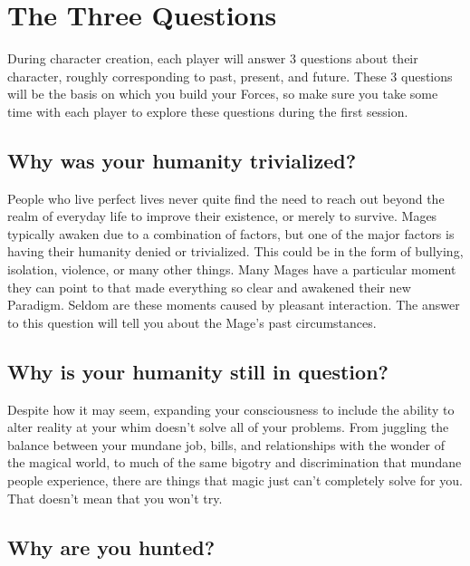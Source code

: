 \documentclass[
  oneside,
  statementpaper,
  9pt]{memoir}
\begin{document}
\hypertarget{the-three-questions-1}{%
\section{The Three Questions}\label{the-three-questions-1}}

During character creation, each player will answer 3 questions about
their character, roughly corresponding to past, present, and future.
These 3 questions will be the basis on which you build your Forces, so
make sure you take some time with each player to explore these questions
during the first session.

\hypertarget{why-was-your-humanity-trivialized}{%
\subsection{Why was your humanity
trivialized?}\label{why-was-your-humanity-trivialized}}

People who live perfect lives never quite find the need to reach out
beyond the realm of everyday life to improve their existence, or merely
to survive. Mages typically awaken due to a combination of factors, but
one of the major factors is having their humanity denied or trivialized.
This could be in the form of bullying, isolation, violence, or many
other things. Many Mages have a particular moment they can point to that
made everything so clear and awakened their new Paradigm. Seldom are
these moments caused by pleasant interaction. The answer to this
question will tell you about the Mage's past circumstances.

\hypertarget{why-is-your-humanity-still-in-question}{%
\subsection{Why is your humanity still in
question?}\label{why-is-your-humanity-still-in-question}}

Despite how it may seem, expanding your consciousness to include the
ability to alter reality at your whim doesn't solve all of your
problems. From juggling the balance between your mundane job, bills, and
relationships with the wonder of the magical world, to much of the same
bigotry and discrimination that mundane people experience, there are
things that magic just can't completely solve for you. That doesn't mean
that you won't try.

\hypertarget{why-are-you-hunted}{%
\subsection{Why are you hunted?}\label{why-are-you-hunted}}
\end{document}
